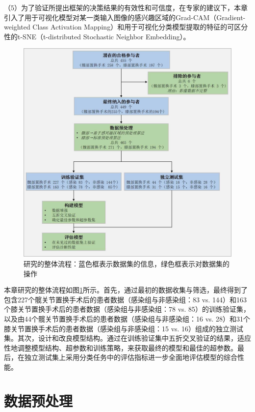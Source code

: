 （5）为了验证所提出框架的决策结果的有效性和可信度，在专家的建议下，本章引入了用于可视化模型对某一类输入图像的感兴趣区域的Grad-CAM（Gradient-weighted Class Activation Mapping）\cite{selvaraju2017grad}和用于可视化分类模型提取的特征的可区分性的t-SNE（t-distributed Stochastic Neighbor Embedding）\cite{van2008visualizing}。

\begin{figure}[htbp]
  \centering
  \includegraphics[width=\textwidth]{figures/chap03_workflow.jpg}
  \caption{研究的整体流程：蓝色框表示数据集的信息，绿色框表示对数据集的操作}
  \label{fig:chap03_workflow}
\end{figure}

本章研究的整体流程如图\ref{fig:chap03_workflow}所示。首先，通过最初的数据收集与筛选，最终得到了包含227个髋关节置换手术后的患者数据（感染组与非感染组：83 vs. 144）和163个膝关节置换手术后的患者数据（感染组与非感染组：78 vs. 85）的训练验证集，以及由44个髋关节置换手术后的患者数据（感染组与非感染组：16 vs. 28）和31个膝关节置换手术后的患者数据（感染组与非感染组：15 vs. 16）组成的独立测试集。其次，设计和改良模型结构。通过在训练验证集中五折交叉验证的结果，适应性地调整模型结构、超参数和训练策略，来获取最终的模型和最佳的超参数。最后，在独立测试集上采用分类任务中的评估指标进一步全面地评估模型的综合性能。

\section{数据预处理}


